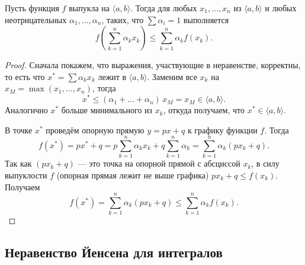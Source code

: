 \begin{theorem} \hypertarget{Йенсен-суммы}{}
	Пусть функция \(f\) выпукла на \(\langle a, b \rangle\). Тогда для любых \(x_1, \ldots, x_n\) из \(\langle a, b \rangle\) и любых неотрицательных \(\alpha_1, \ldots, \alpha_n\), таких, что \(\sum \alpha_i = 1\) выполняется \[
	f \left(\sum_{k=1}^n \alpha_k x_k \right) \leqslant \sum_{k=1}^n \alpha_k f(x_k). 
	\]
\end{theorem}
\begin{proof}
	Сначала покажем, что выражения, участвующие в неравенстве, корректны, то есть что \(x^* = \sum \alpha_k x_k\) лежит в  \(\langle a, b \rangle\). Заменим все \(x_k\) на \(x_M = \max(x_1, \ldots, x_n)\), тогда \[
	x^* \leqslant (\alpha_1 + \ldots + \alpha_n) \, x_M = x_M \in \langle a, b \rangle.
	\]
	Аналогично \(x^*\) больше минимального из \(x_k\), откуда получаем, что \(x^* \in \langle a, b \rangle\).
	
	В точке \(x^*\) проведём опорную прямую \(y = px + q\) к графику функции \(f\). Тогда \[
	f(x^*) = px^* + q = p \sum_{k=1}^n \alpha_k x_k + q \sum_{k=1}^n \alpha_k = \sum_{k=1}^n \alpha_k (px_k + q).
	\]
	Так как \((px_k + q)\) --- это точка на опорной прямой с абсциссой \(x_k\), в силу выпуклости \(f\) (опорная прямая лежит не выше графика) \(px_k + q \leqslant f(x_k)\). Получаем \[
	f(x^*) = \sum_{k=1}^n \alpha_k (px_k + q) \leqslant \sum_{k=1}^n \alpha_k f(x_k).
	\]
\end{proof}

\subsection{Неравенство Йенсена для интегралов}

